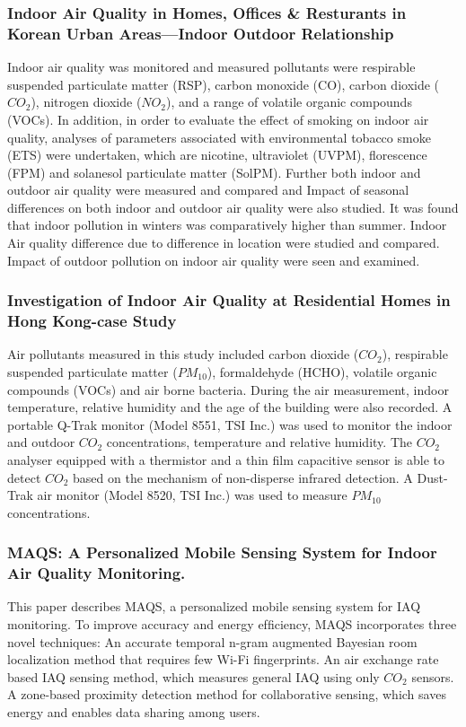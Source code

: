 \subsubsection{Indoor Air Quality in Homes, Offices \& Resturants in Korean Urban Areas—Indoor Outdoor Relationship}
Indoor air quality was monitored and measured pollutants were respirable suspended particulate matter (RSP), carbon monoxide (CO), carbon dioxide ($CO_2$), nitrogen dioxide ($NO_2$), and a range of volatile organic compounds (VOCs). In addition, in order to evaluate the effect of smoking on indoor air quality, analyses of parameters associated with environmental tobacco smoke (ETS) were undertaken, which are nicotine, ultraviolet (UVPM), florescence (FPM) and solanesol particulate matter (SolPM). Further both indoor and outdoor air quality were measured and compared and Impact of seasonal differences on both indoor and outdoor air quality were also studied. It was found that indoor pollution in winters was comparatively higher than summer. Indoor Air quality difference due to difference in location were studied and compared. Impact of outdoor pollution on indoor air quality were seen and examined.

\subsubsection{Investigation of Indoor Air Quality at Residential Homes in Hong Kong-case Study}
Air pollutants measured in this study included carbon dioxide ($CO_2$), respirable suspended particulate matter ($PM_{10}$), formaldehyde (HCHO), volatile organic compounds (VOCs) and air borne bacteria. During the air measurement, indoor temperature, relative humidity and the age of the building were also recorded. A portable Q-Trak monitor (Model 8551, TSI Inc.) was used to monitor the indoor and outdoor $CO_2$ concentrations, temperature and relative humidity. The $CO_2$ analyser equipped with a thermistor and a thin ﬁlm capacitive sensor is able to detect $CO_2$ based on the mechanism of non-disperse infrared detection. A Dust-Trak air monitor (Model 8520, TSI Inc.) was used to measure $PM_{10}$ concentrations.

\subsubsection{MAQS: A Personalized Mobile Sensing System for Indoor Air Quality Monitoring.}
This paper describes MAQS, a personalized mobile sensing system for IAQ monitoring.
To improve accuracy and energy efﬁciency, MAQS incorporates three novel techniques:
An accurate temporal n-gram augmented Bayesian room localization method that requires few Wi-Fi ﬁngerprints.
An air exchange rate based IAQ sensing method, which measures general IAQ using only $CO_2$ sensors. 
A zone-based proximity detection method for collaborative sensing, which saves energy and enables data sharing among users.


